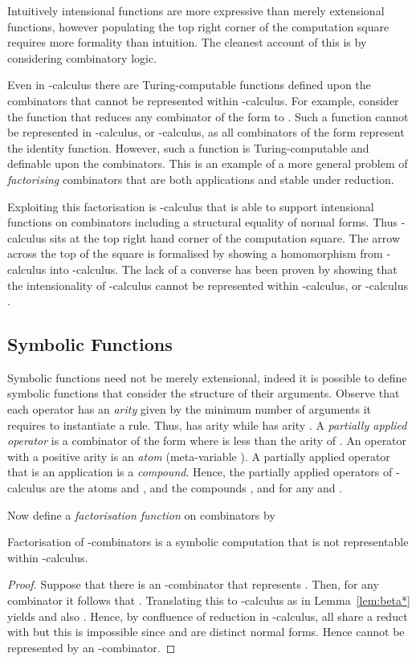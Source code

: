\documentclass{llncs}
\begin{document}
Intuitively intensional functions are more expressive than merely extensional functions,
however populating the top right corner of the computation square requires more formality than intuition.
The cleanest account of this is by considering combinatory logic.

Even in -calculus there are Turing-computable functions defined upon the combinators that cannot be represented within -calculus.
For example, consider the function that reduces any combinator of the form  to .
Such a function cannot be represented in -calculus, or -calculus, as all combinators of the form  represent the identity function. However, such a function is Turing-computable and definable upon the combinators.
This is an example of a more general problem of {\em factorising} combinators that are both applications and stable under reduction.

Exploiting this factorisation is -calculus \cite{JayGW11} that is able to support intensional functions on combinators including a structural equality of normal forms.
Thus -calculus sits at the top right hand corner of the computation square.
The arrow across the top of the square is formalised by showing a homomorphism from -calculus into -calculus. The lack of a converse has been proven by showing that the intensionality of -calculus cannot be represented within -calculus, or -calculus \cite{JayGW11}.

\subsection{Symbolic Functions}
\label{sec:SF-sym}

Symbolic functions need not be merely extensional, indeed it is possible to define symbolic functions that consider the structure of their arguments.
Observe that each operator  has an {\em arity} given by the minimum number of arguments it requires to
instantiate a rule. Thus,  has arity  while  has arity . A
{\em partially applied operator} is a combinator of the form
 where  is less than the arity of .  An operator
with a positive arity is an {\em atom} (meta-variable ).  A
partially applied operator that is an application is a {\em compound}.
Hence, the partially applied operators of -calculus are the atoms
 and , and the compounds ,  and  for any  and
.

Now define a {\em factorisation function}  on
combinators by



\begin{lemma}
\label{lem:noFinSK:1}
Factorisation of -combinators is a symbolic computation that is
not representable within -calculus.
\end{lemma}
\begin{proof}
  Suppose that there is an -combinator  that represents
  .  Then, for any combinator  it follows that
. Translating this to -calculus as in Lemma~\ref{lem:beta*} yields
 and also
. Hence, by confluence of reduction in -calculus, all  share a reduct with  but this is  impossible since
 and  are distinct normal forms.
Hence  cannot be represented by an  -combinator. 
\end{proof}
\end{document}
